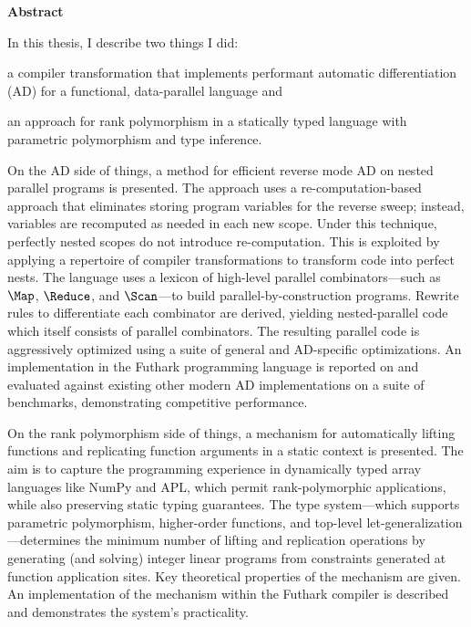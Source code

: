 
\begin{center}
\textbf{Abstract}
\end{center}
In this thesis, I describe two things I did:
\begin{enumerate*}[label=\arabic*)]
\item a compiler transformation that
implements performant automatic differentiation (AD) for a functional,
data-parallel language and
\item an approach for rank polymorphism in a statically typed language with
  parametric polymorphism and type inference.
\end{enumerate*}

On the AD side of things, a method for efficient reverse mode AD on nested
parallel programs is presented. The approach uses a re-computation-based approach
that eliminates storing program variables for the reverse sweep; instead,
variables are recomputed as needed in each new scope. Under this technique,
perfectly nested scopes do not introduce re-computation. This is exploited by
applying a repertoire of compiler transformations to transform code into perfect
nests.
%
The language uses a lexicon of high-level parallel combinators---such as
$\Map$, $\Reduce$, and $\Scan$---to build
parallel-by-construction programs. Rewrite rules to differentiate each
combinator are derived, yielding nested-parallel code which itself consists of
parallel combinators. The resulting parallel code is aggressively optimized
using a suite of general and AD-specific optimizations.
%
An implementation in the Futhark programming language is reported on and
evaluated against existing other modern AD implementations on a suite of
benchmarks, demonstrating competitive performance.

On the rank polymorphism side of things, a mechanism for automatically lifting
functions and replicating function arguments in a static context is
presented. The aim is to capture the programming experience in dynamically typed
array languages like NumPy and APL, which permit rank-polymorphic applications,
while also preserving static typing guarantees. The type system---which supports
parametric polymorphism, higher-order functions, and top-level
let-generalization---determines the minimum number of lifting and replication
operations by generating (and solving) integer linear programs from constraints
generated at function application sites. Key theoretical properties of the
mechanism are given. An implementation of the mechanism within the Futhark
compiler is described and demonstrates the system's practicality.

